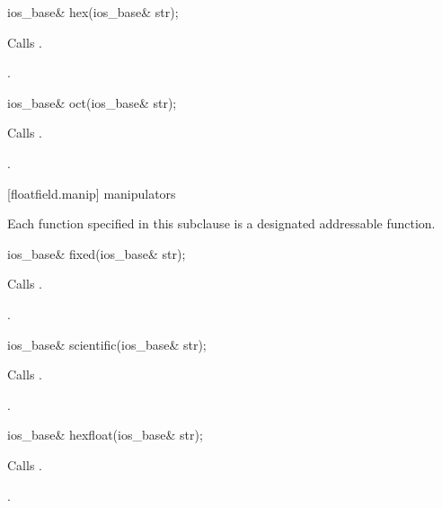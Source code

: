 %
\begin{itemdecl}
ios_base& hex(ios_base& str);
\end{itemdecl}

\begin{itemdescr}
\pnum
\effects
Calls
.

\pnum
\returns
{}.
\end{itemdescr}

%
\begin{itemdecl}
ios_base& oct(ios_base& str);
\end{itemdecl}

\begin{itemdescr}
\pnum
\effects
Calls
.

\pnum
\returns
{}.
\end{itemdescr}

[floatfield.manip]{ manipulators}

\pnum
Each function specified in this subclause
is a designated addressable function.

%
\begin{itemdecl}
ios_base& fixed(ios_base& str);
\end{itemdecl}

\begin{itemdescr}
\pnum
\effects
Calls
.

\pnum
\returns
{}.
\end{itemdescr}

%
\begin{itemdecl}
ios_base& scientific(ios_base& str);
\end{itemdecl}

\begin{itemdescr}
\pnum
\effects
Calls
.

\pnum
\returns
{}.
\end{itemdescr}

%
\begin{itemdecl}
ios_base& hexfloat(ios_base& str);
\end{itemdecl}

\begin{itemdescr}
\pnum
\effects
Calls .

\pnum
\returns
{}.
\end{itemdescr}

